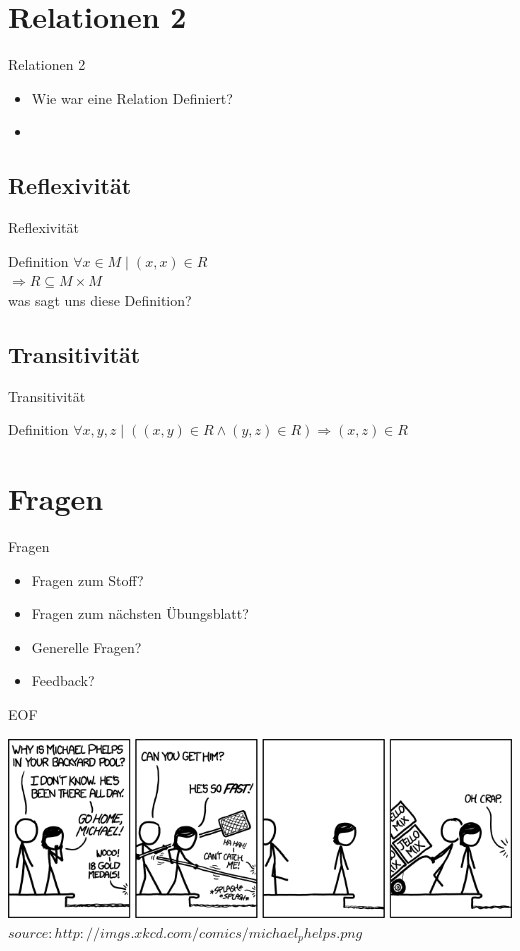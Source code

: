 	
	
	\section{Relationen 2}
	\begin{frame}{Relationen 2}
		\begin{itemize}
			\item Wie war eine Relation Definiert?
			
			\pause
			\item 
		\end{itemize}
	\end{frame}
	
	
	\subsection{Reflexivität}
	\begin{frame}{Reflexivität}
		\begin{block}{Definition}
			$\forall x \in M \;|\; (x,x) \in R$\\
			$\Rightarrow R \subseteq M \times M$\\
			\pause
			was sagt uns diese Definition?
		\end{block}
	\end{frame}
	
	
	\subsection{Transitivität}
	\begin{frame}{Transitivität}
		\begin{block}{Definition}
			$\forall x,y,z \;|\; ((x,y) \in R \land (y,z) \in R) \Rightarrow (x,z) \in R$\\
		\end{block}
	\end{frame}
	
	
	
	\section{Fragen}
	\begin{frame} {Fragen}
		\begin{itemize}
			\item Fragen zum Stoff?
			\item Fragen zum n\"achsten \"Ubungsblatt?
			\item Generelle Fragen?
			\item Feedback?
		\end{itemize}
	\end{frame}

		
	\begin{frame} {EOF}
		\begin{center}
			\includegraphics[scale=0.4]{graphics/eof4.png}\\
			\tiny $source: http://imgs.xkcd.com/comics/michael_phelps.png$
		\end{center}
	\end{frame}


